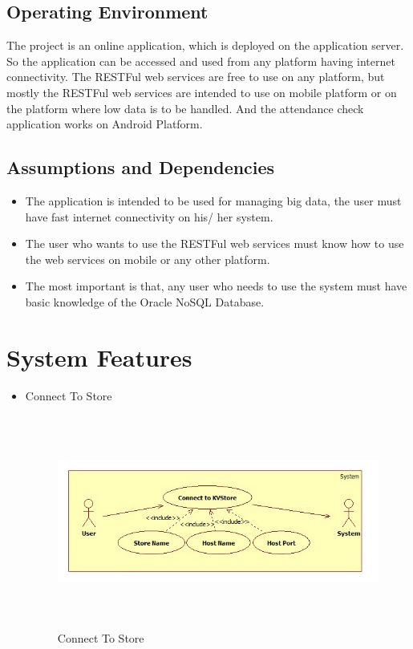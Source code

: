 \subsection{Operating Environment}
\hspace*{0.7in} The project is an online application, which is deployed on the application server. So the application can be accessed and used from any platform having internet connectivity. The RESTFul web services are free to use on any platform, but mostly the RESTFul web services are intended to use on mobile platform or on the platform where low data is to be handled. And the attendance check application works on Android Platform.

\subsection{Assumptions and Dependencies}
\begin{itemize}
  \item The application is intended to be used for managing big data, the user must have fast internet connectivity on his/ her system.
  \item The user who wants to use the RESTFul web services must know how to use the web services on mobile or any other platform.
  \item The most important is that, any user who needs to use the system must have basic knowledge of the Oracle NoSQL Database.
\end{itemize}


\section{System Features}
\begin{itemize}
  \item Connect To Store
\begin{figure}[h]
\centering
  \includegraphics[width=13cm,height=7cm]{Fig1.jpg}
  \caption{Connect To Store}\label{Connect To Store}
\end{figure}
\end{itemize}

